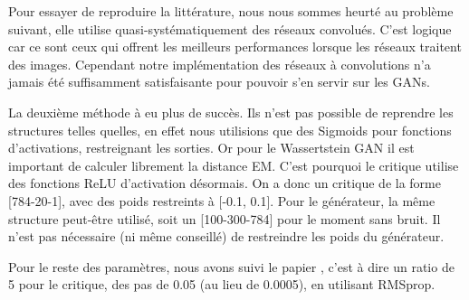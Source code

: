 	Pour essayer de reproduire la littérature, nous nous sommes heurté au problème suivant, elle utilise quasi-systématiquement des réseaux convolués. C'est logique car ce sont ceux qui offrent les meilleurs performances lorsque les réseaux traitent des images. Cependant notre implémentation des réseaux à convolutions n'a jamais été suffisamment satisfaisante pour pouvoir s'en servir sur les GANs.

 	La deuxième méthode à eu plus de succès. Ils n'est pas possible de reprendre les structures telles quelles, en effet nous utilisions que des Sigmoids pour fonctions d'activations, restreignant les sorties. Or pour le Wassertstein GAN il est important de calculer librement la distance EM. C'est pourquoi le critique utilise des fonctions ReLU d'activation désormais. On a donc un critique de la forme [784-20-1], avec des poids restreints à [-0.1, 0.1]. Pour le générateur, la même structure peut-être utilisé, soit un [100-300-784] pour le moment sans bruit. Il n'est pas nécessaire (ni même conseillé) de restreindre les poids du générateur.

 	Pour le reste des paramètres, nous avons suivi le papier \cite{arjovsky_wasserstein_2017}, c'est à dire un ratio de 5 pour le critique, des pas de 0.05 (au lieu de 0.0005), en utilisant RMSprop.

